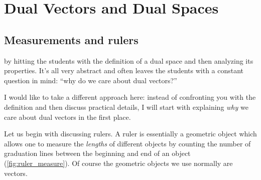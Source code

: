 \section{Dual Vectors and Dual Spaces}

\subsection{Measurements and rulers}
 by hitting the students with the definition of a dual space and then analyzing its properties. It's all very abstract and often leaves the students with a constant question in mind: \enquote{why do we care about dual vectors?}

I would like to take a different approach here: instead of confronting you with the definition and then discuss practical details, I will start with explaining \textit{why} we care about dual vectors in the first place.

Let us begin with discussing rulers. A ruler is essentially a geometric object which allows one to measure the \textit{lengths} of different objects by counting the number of graduation lines between the beginning and end of an object (\cref{fig:ruler_measure}). Of course the geometric objects we use normally are vectors.

